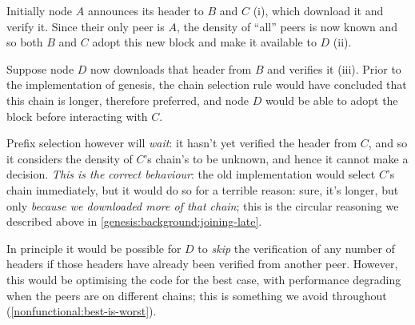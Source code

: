 Initially node $A$ announces its header to $B$ and $C$ (i), which download it
and verify it. Since their only peer is $A$, the density of ``all'' peers is now
known and so both $B$ and $C$ adopt this new block and make it available to $D$
(ii).

Suppose node $D$ now downloads that header from $B$ and verifies it (iii).
Prior to the implementation of genesis, the chain selection rule would have
concluded that this chain is longer, therefore preferred, and node $D$ would be
able to adopt the block before interacting with $C$.

Prefix selection however will \emph{wait}: it hasn't yet verified the header
from $C$, and so it considers the density of $C$'s chain's to be unknown, and
hence it cannot make a decision. \emph{This is the correct behaviour}: the
old implementation would select $C$'s chain immediately, but it would do so
for a terrible reason: sure, it's longer, but only \emph{because we downloaded
more of that chain}; this is the circular reasoning we described above in
\cref{genesis:background:joining-late}.

In principle it would be possible for $D$ to \emph{skip} the verification of
any number of headers if those headers have already been verified from another
peer. However, this would be optimising the code for the best case, with
performance degrading when the peers are on different chains; this is something
we avoid throughout (\cref{nonfunctional:best-is-worst}).








